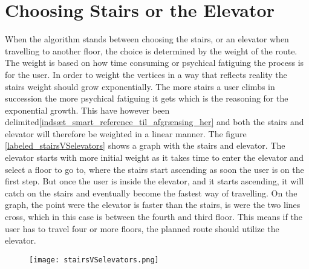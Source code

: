 \section{Choosing Stairs or the Elevator}
When the algorithm stands between choosing the stairs, or an elevator when travelling to another floor, the choice is determined by the weight of the route. The weight is based on how time consuming or psychical fatiguing the process is for the user. In order to weight the vertices in a way that reflects reality the stairs weight should grow exponentially. The more stairs a user climbs in succession the more psychical fatiguing it gets which is the reasoning for the exponential growth. This have however been delimited\cref{indsæt_smart_reference_til_afgrænsing_her} and both the stairs and elevator will therefore be weighted in a linear manner. The figure \cref{labeled_stairsVSelevators} shows a graph with the stairs and elevator. The elevator starts with more initial weight as it takes time to enter the elevator and select a floor to go to, where the stairs start ascending as soon the user is on the first step. But once the user is inside the elevator, and it starts ascending, it will catch on the stairs and eventually become the fastest way of travelling. On the graph, the point were the elevator is faster than the stairs, is were the two lines cross, which in this case is between the fourth and third floor. This means if the user has to travel four or more floors, the planned route should utilize the elevator.
\begin{figure}[ht!]
    \centering
    \texttt{[image: stairsVSelevators.png]}
    \label{fig:labeled_stairsVSelevators}
  \end{figure}